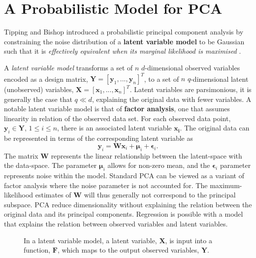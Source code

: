 \documentclass[ %
author={Dillon Keith Diep},
supervisor={Dr. Carl Henrik Ek},
degree={MEng},
title={ART-CG Hair:},
subtitle={Assisted Real-time Content Generation of Stylised Virtual Hair},
type={Research},
year={2017} ]{dissertation}
\begin{document}
\section{A Probabilistic Model for PCA}
Tipping and Bishop introduced a probabilistic principal component analysis by constraining the noise distribution of a \textbf{latent variable model} to be Gaussian such that it is \textit{effectively equivalent when its marginal likelihood is maximised} \cite{ppca}.

A \textit{latent variable model} transforms a set of $n$ $d$-dimensional observed variables encoded as a design matrix, $\bm{Y}=[\bm{y}_1,...,\bm{y}_n]^T$, to a set of $n$ $q$-dimensional latent (unobserved) variables, $\bm{X}=[\bm{x}_1,...,\bm{x}_n]^T$. Latent variables are parsimonious, it is generally the case that $q \ll d$, explaining the original data with fewer variables. A notable latent variable model is that of \textbf{factor analysis}, one that assumes linearity in relation of the observed data set.
For each observed data point, $\bm{y}_i \in \bm{Y}$, $1 \leq i \leq n $, there is an associated latent variable $\bm{x_i}$. The original data can be represented in terms of the corresponding latent variable as
\begin{equation} \label{ppca:fa}
\bm{y}_i=\bm{Wx}_i+\bm{\mu}_i+\bm{\epsilon}_i.
\end{equation}
The matrix $\bm{W}$ represents the linear relationship between the latent-space with the data-space.
The parameter $\bm{\mu}_i$ allows for non-zero mean, and the $\bm{\epsilon}_i$ parameter represents noise within the model. Standard PCA can be viewed as a variant of factor analysis where the noise parameter is not accounted for. The maximum-likelihood estimates of $\bm{W}$ will thus generally not correspond to the principal subspace. PCA reduce dimensionality without explaining the relation between the original data and its principal components. Regression is possible with a model that explains the relation between observed variables and latent variables.

\begin{figure}[!h]
	\centering
	\caption{In a latent variable model, a latent variable, $\bm{X}$, is input into a function, $\bm{F}$, which maps to the output observed variables, $\bm{Y}$.}
\end{figure} 
\end{document}
